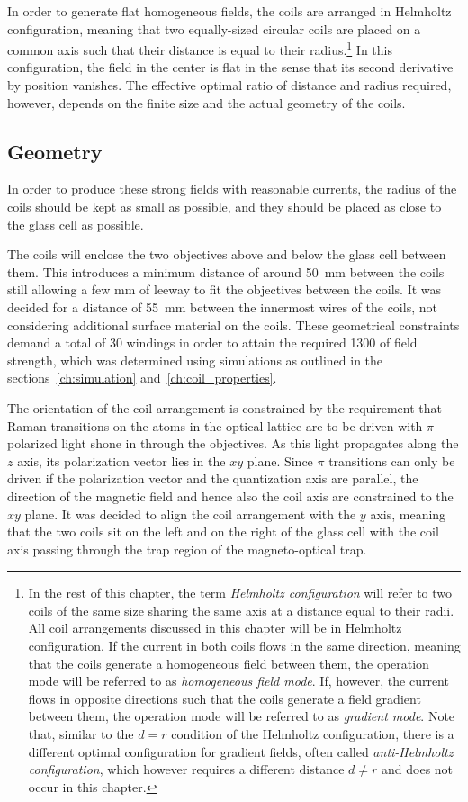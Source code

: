 In order to generate flat homogeneous fields, the coils are arranged in Helmholtz configuration, meaning that two equally-sized circular coils are placed on a common axis such that their distance is equal to their radius.\footnote{In the rest of this chapter, the term \textit{Helmholtz configuration} will refer to two coils of the same size sharing the same axis at a distance equal to their radii. All coil arrangements discussed in this chapter will be in Helmholtz configuration. If the current in both coils flows in the same direction, meaning that the coils generate a homogeneous field between them, the operation mode will be referred to as \textit{homogeneous field mode}. If, however, the current flows in opposite directions such that the coils generate a field gradient between them, the operation mode will be referred to as \textit{gradient mode}. Note that, similar to the $d = r$ condition of the Helmholtz configuration, there is a different optimal configuration for gradient fields, often called \textit{anti-Helmholtz configuration}, which however requires a different distance $d \neq r$ and does not occur in this chapter.} In this configuration, the field in the center is flat in the sense that its second derivative by position vanishes. The effective optimal ratio of distance and radius required, however, depends on the finite size and the actual geometry of the coils.

\subsection*{Geometry}
In order to produce these strong fields with reasonable currents, the radius of the coils should be kept as small as possible, and they should be placed as close to the glass cell as possible.

The coils will enclose the two objectives above and below the glass cell between them. This introduces a minimum distance of around \SI{50}{\milli\meter} between the coils still allowing a few \si[]{\milli\meter} of leeway to fit the objectives between the coils. It was decided for a distance of \SI{55}{\milli\meter} between the innermost wires of the coils, not considering additional surface material on the coils. These geometrical constraints demand a total of 30 windings in order to attain the required \SI{1300}{\gauss} of field strength, which was determined using simulations as outlined in the sections~\ref{ch:simulation} and~\ref{ch:coil_properties}.

The orientation of the coil arrangement is constrained by the requirement that Raman transitions on the atoms in the optical lattice are to be driven with $\pi$-polarized light shone in through the objectives. As this light propagates along the $z$ axis, its polarization vector lies in the $xy$ plane. Since $\pi$ transitions can only be driven if the polarization vector and the quantization axis are parallel, the direction of the magnetic field and hence also the coil axis are constrained to the $xy$ plane. It was decided to align the coil arrangement with the $y$ axis, meaning that the two coils sit on the left and on the right of the glass cell with the coil axis passing through the trap region of the magneto-optical trap.

